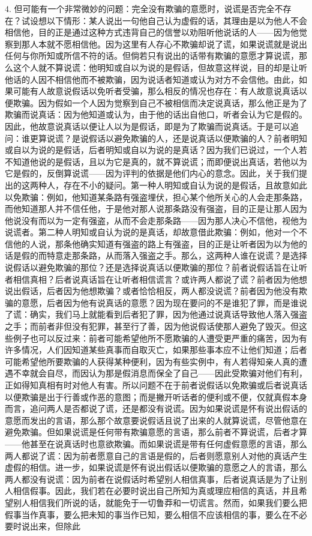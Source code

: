 4. 但可能有一个非常微妙的问题：完全没有欺骗的意愿时，说谎是否完全不存在？试设想以下情形：某人说出一句他自己认为虚假的话，其理由是以为他人不会相信他，目的正是通过这种方式违背自己的信誉以劝阻听他说话的人——因为他觉察到那人本就不愿相信他。因为这里有人存心不欺骗却说了谎，如果说谎就是说出任何与你所知或所信不符的话。但倘若只有说出的话带有欺骗的意愿才算说谎，那么这个人就不算说谎：他明知或自以为说的是假话，但故意这样说，目的却是让听他话的人因不相信他而不被欺骗，因为说话者知道或认为对方不会信他。由此，如果可能有人故意说假话以免听者受骗，那么相反的情况也存在：有人故意说真话以便欺骗。因为假如一个人因为觉察到自己不被相信而决定说真话，那么他正是为了欺骗而说真话：因为他知道或认为，由于他的话出自他口，听者会认为它是假的。因此，他故意说真话以便让人以为是假话，即是为了欺骗而说真话。于是可以追问：谁更算说谎？是说假话以避免欺骗的人，还是说真话以便欺骗的人？前者明知或自以为说的是假话，后者明知或自以为说的是真话？因为我们已说过，一个人若不知道他说的是假话，且以为它是真的，就不算说谎；而即便说出真话，若他以为它是假的，反倒算说谎——因为评判的依据是他们内心的意念。因此，关于我们提出的这两种人，存在不小的疑问。第一种人明知或自认为说的是假话，且故意如此以免欺骗：例如，他知道某条路有强盗埋伏，担心某个他所关心的人会走那条路，而他知道那人并不信任他，于是他对那人说那条路没有强盗，目的正是让那人因为他说没有而以为一定有强盗，从而不会走那条路——因为那人决心不信他，视他为说谎者。第二种人明知或自认为说的是真话，却故意借此欺骗：例如，他对一个不信他的人说，那条他确实知道有强盗的路上有强盗，目的正是让听者因为以为他的话是假的而特意走那条路，从而落入强盗之手。那么，这两种人谁在说谎？是选择说假话以避免欺骗的那位？还是选择说真话以便欺骗的那位？前者说假话旨在让听者相信真相？后者说真话旨在让听者相信谎言？或许两人都说了谎？前者因为他想说出假话，后者因为他想欺骗？或者恰恰相反，两人都没说谎？前者因为他没有欺骗的意愿，后者因为他有说真话的意愿？因为现在要问的不是谁犯了罪，而是谁说了谎：确实，我们马上就能看到后者犯了罪，因为他通过说真话导致他人落入强盗之手；而前者非但没有犯罪，甚至行了善，因为他说假话使那人避免了毁灭。但这些例子也可以反过来：前者可能希望他所不愿欺骗的人遭受更严重的痛苦，因为有许多情况，人们因知道某些真事而自取灭亡，如果那些事本应不让他们知道；后者可能希望他所要欺骗的人获得某种便利，因为有些实例中，有人若得知亲人真的遭遇不幸就会自尽，而因认为那是假消息而保全了自己——因此受欺骗对他们有利，正如得知真相有时对他人有害。所以问题不在于前者说假话以免欺骗或后者说真话以便欺骗是出于行善或作恶的意图；而是撇开听话者的便利或不便，仅就真假本身而言，追问两人是否都说了谎，还是都没有说谎。因为如果说谎是怀有说出假话的意愿而发出的言语，那么那个故意要说假话且说了出来的人就算说谎，尽管他意在避免欺骗。但如果说谎是任何带有欺骗意愿的言语，那么前者不算说谎，后者才算——他甚至在说真话时也意欲欺骗。而如果说谎是带有任何虚假意愿的言语，那么两人都说了谎：因为前者愿意自己的言语是假的，后者则愿意别人对他的真话产生虚假的相信。进一步，如果说谎是怀有说出假话以便欺骗的意愿之人的言语，那么两人都没有说谎：因为前者在说假话时希望别人相信真事，后者说真话是为了让别人相信假事。因此，我们若在必要时说出自己所知为真或理应相信的真话，并且希望别人相信我们所说的话，就能免于一切鲁莽和一切谎言。然而，如果我们要么把假事当作真事，要么把未知的事当作已知，要么相信不应该相信的事，要么在不必要时说出来，但除此